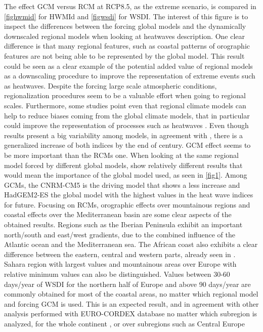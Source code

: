 The effect GCM versus RCM at RCP8.5, as the extreme scenario, is compared in
\ref{fighwmid} for HWMId and \ref{figwsdi} for WSDI. The interest of this figure is to
inspect the differences between
the forcing global models and the dynamically downscaled regional models when
looking at heatwaves description. One clear difference is that many regional features, such as coastal patterns
of orographic features are not being able to be represented by the global model.
This result could be seen as a clear example of the potential added value of
regional models as a downscaling procedure to improve the representation of extreme
events such as heatwaves. Despite the forcing large scale atmospheric
conditions, regionalization procedures seem to be a valuable effort when going
to regional scales. Furthermore, some studies point even that regional climate
models can help to reduce biases coming from the global climate models, that
in particular could improve the representation of processes such as heatwaves \cite{sor_al2018}.
Even though results present a big variability among models, in agreement with
\cite{vau_al2013}, there is a generalized increase of both indices by the end of
century. GCM effect seems to be more important than the RCMs one. When looking at the
same regional model forced by different global models, show relatively different
results that would mean the importance of the global model used, as seen in
\ref{fig1}. 
Among GCMs, the CNRM-CM5 is the driving model that shows a less increase and
HadGEM2-ES the global model with the highest values in the heat wave indices for
future. 
Focusing on RCMs, orographic effects over mountainous regions and coastal effects over
the Mediterranean basin \cite{Car_al2019} are some clear aspects of the obtained
results. Regions such as the Iberian Peninsula exhibit an important north/south 
and east/west gradients, due to the combined influence of the Atlantic ocean and
the Mediterranean sea. The African coast also exhibits a clear difference between the
eastern, central and western parts, already seen in \cite{dos2017}. Sahara region with
largest values and mountainous
areas over Europe with relative minimum values can also be distinguished. 
Values between 30-60 days/year of WSDI for the northern half
of Europe and above 90 days/year are commonly obtained for most of the coastal
areas, no matter which regional model and forcing GCM is used. This is an expected
result, and in agreement with other analysis performed
with EURO-CORDEX database no matter which subregion is analyzed, for the whole
continent \cite{jac_al2014}, or over subregions such as Central Europe
